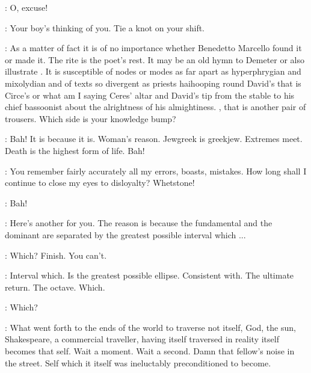 \Kitty:
O, excuse!

\Zoe:
Your boy's thinking of you.
Tie a knot on your shift.


\Stephen:
As a matter of fact it is of no importance
whether Benedetto Marcello found it or made it.
The rite is the poet's rest.
It may be an old hymn to Demeter
or also illustrate .
It is susceptible of nodes or modes as far apart as hyperphrygian and mixolydian
and of texts so divergent as priests haihooping round
David's that is Circe's or what am I saying Ceres' altar
and David's tip from the stable to his chief bassoonist
about the alrightness of his almightiness.
, that is another pair of trousers.
Which side is your knowledge bump?

\Cap:
Bah!
It is because it is.
Woman's reason.
Jewgreek is greekjew.
Extremes meet.
Death is the highest form of life.
Bah!

\Stephen:
You remember fairly accurately all my errors, boasts, mistakes.
How long shall I continue to close my eyes to disloyalty?
Whetstone!

\Cap:
Bah!

\Stephen:
Here's another for you.
The reason is because the fundamental and the dominant
are separated by the greatest possible interval which ...

\Cap:
Which?
Finish.
You can't.

\Stephen:
Interval which.
Is the greatest possible ellipse.
Consistent with.
The ultimate return.
The octave.
Which.

\Cap:
Which?


\Stephen:
What went forth to the ends of the world to traverse not itself,
God, the sun, Shakespeare, a commercial traveller,
having itself traversed in reality itself becomes that self.
Wait a moment.
Wait a second.
Damn that fellow's noise in the street.
Self which it itself was ineluctably preconditioned to become.

